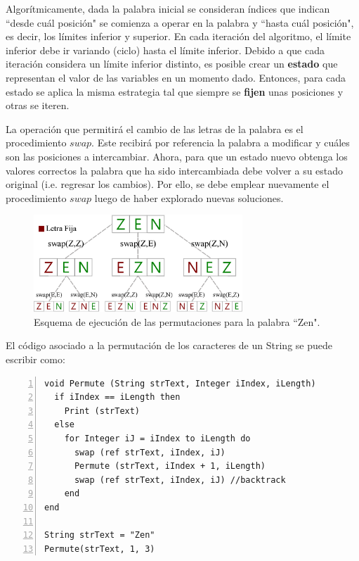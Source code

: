 Algorítmicamente, dada la palabra inicial se consideran índices que indican ``desde cuál posición" se comienza a operar en la palabra y ``hasta cuál posición", es decir, los límites inferior y superior. En cada iteración del algoritmo, el límite inferior debe ir variando (ciclo) hasta el límite inferior. Debido a que cada iteración considera un límite inferior distinto, es posible crear un \textbf{estado} que representan el valor de las variables en un momento dado. Entonces, para cada estado se aplica la misma estrategia tal que siempre se \textbf{fijen} unas posiciones y otras se iteren.

La operación que permitirá el cambio de las letras de la palabra es el procedimiento $swap$. Este recibirá por referencia la palabra a modificar y cuáles son las posiciones a intercambiar. Ahora, para que un estado nuevo obtenga los valores correctos la palabra que ha sido intercambiada debe volver a su estado original (i.e. regresar los cambios). Por ello, se debe emplear nuevamente el procedimiento $swap$ luego de haber explorado nuevas soluciones.

\begin{figure}[htpb!]
  \begin{center}
    \includegraphics[width=0.7\textwidth]{images/backtracking.eps}
  \end{center}
  \caption{Esquema de ejecución de las permutaciones para la palabra ``Zen".}
  \label{fig:Ch2permutacion}
\end{figure}

El código asociado a la permutación de los caracteres de un String se puede escribir como:

\begin{lstlisting}[upquote=true, language=pseudo, numbers=left]
void Permute (String strText, Integer iIndex, iLength)
  if iIndex == iLength then
    Print (strText)
  else
    for Integer iJ = iIndex to iLength do
      swap (ref strText, iIndex, iJ)
      Permute (strText, iIndex + 1, iLength)
      swap (ref strText, iIndex, iJ) //backtrack
    end
end

String strText = "Zen"
Permute(strText, 1, 3)
\end{lstlisting}

